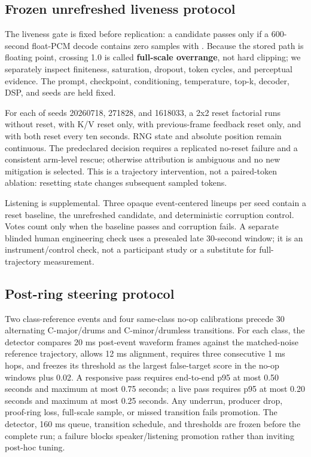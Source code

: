 \documentclass[10pt]{article}
\begin{document}
\subsection{Frozen unrefreshed liveness protocol}
The liveness gate is fixed before replication: a candidate passes only if a 600-second float-PCM decode contains zero samples with \texttt{}. Because the stored path is floating point, crossing 1.0 is called \textbf{full-scale overrange}, not hard clipping; we separately inspect finiteness, saturation, dropout, token cycles, and perceptual evidence. The prompt, checkpoint, conditioning, temperature, top-k, decoder, DSP, and seeds are held fixed.

For each of seeds 20260718, 271828, and 1618033, a 2x2 reset factorial runs without reset, with K/V reset only, with previous-frame feedback reset only, and with both reset every ten seconds. RNG state and absolute position remain continuous. The predeclared decision requires a replicated no-reset failure and a consistent arm-level rescue; otherwise attribution is ambiguous and no new mitigation is selected. This is a trajectory intervention, not a paired-token ablation: resetting state changes subsequent sampled tokens.

Listening is supplemental. Three opaque event-centered lineups per seed contain a reset baseline, the unrefreshed candidate, and deterministic corruption control. Votes count only when the baseline passes and corruption fails. A separate blinded human engineering check uses a presealed late 30-second window; it is an instrument/control check, not a participant study or a substitute for full-trajectory measurement.

\subsection{Post-ring steering protocol}
Two class-reference events and four same-class no-op calibrations precede 30 alternating C-major/drums and C-minor/drumless transitions. For each class, the detector compares 20 ms post-event waveform frames against the matched-noise reference trajectory, allows 12 ms alignment, requires three consecutive 1 ms hops, and freezes its threshold as the largest false-target score in the no-op windows plus 0.02. A responsive pass requires end-to-end p95 at most 0.50 seconds and maximum at most 0.75 seconds; a live pass requires p95 at most 0.20 seconds and maximum at most 0.25 seconds. Any underrun, producer drop, proof-ring loss, full-scale sample, or missed transition fails promotion. The detector, 160 ms queue, transition schedule, and thresholds are frozen before the complete run; a failure blocks speaker/listening promotion rather than inviting post-hoc tuning.
\end{document}
